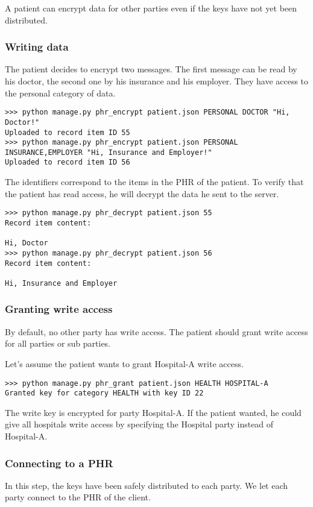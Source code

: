 \documentclass[a4paper]{article}
\begin{document}
			A patient can encrypt data for other parties even if the keys have not yet been distributed.
		
		\subsubsection{Writing data}
			The patient decides to encrypt two messages. The first message can be read by his doctor, the second one by his insurance and his employer. They have access to the personal category of data.
		
			\begin{lstlisting}
>>> python manage.py phr_encrypt patient.json PERSONAL DOCTOR "Hi, Doctor!"
Uploaded to record item ID 55
>>> python manage.py phr_encrypt patient.json PERSONAL INSURANCE,EMPLOYER "Hi, Insurance and Employer!"
Uploaded to record item ID 56
			\end{lstlisting}
		
			The identifiers correspond to the items in the PHR of the patient. To verify that the patient has read access, he will decrypt the data he sent to the server.
		
			\begin{lstlisting}
>>> python manage.py phr_decrypt patient.json 55
Record item content:

Hi, Doctor
>>> python manage.py phr_decrypt patient.json 56
Record item content:

Hi, Insurance and Employer
			\end{lstlisting}
		
		\subsubsection{Granting write access}
			By default, no other party has write access. The patient should grant write access for all parties or sub parties.
		
			Let's assume the patient wants to grant Hospital-A write access.
			
			\begin{lstlisting}		
>>> python manage.py phr_grant patient.json HEALTH HOSPITAL-A
Granted key for category HEALTH with key ID 22
			\end{lstlisting}
			
			The write key is encrypted for party Hospital-A. If the patient wanted, he could give all hospitals write access by specifying the Hospital party instead of Hospital-A.
		
		\subsubsection{Connecting to a PHR}
			In this step, the keys have been safely distributed to each party. We let each party connect to the PHR of the client.
		
\end{document}
